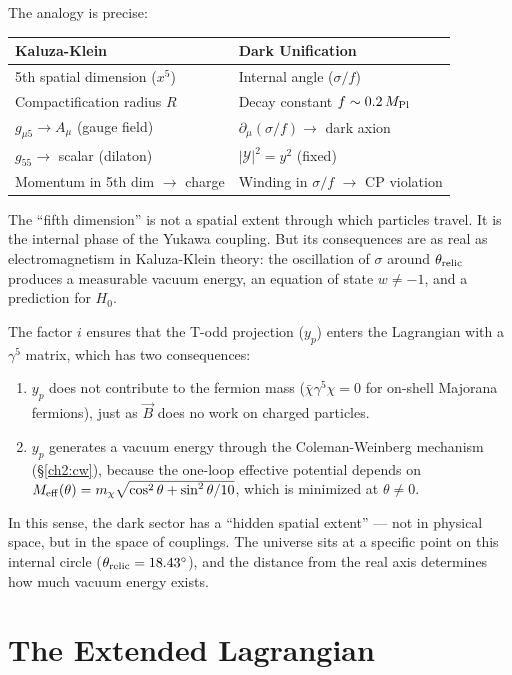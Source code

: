 The analogy is precise:

\begin{table}[h!]
\centering
\begin{tabular}{ll}
\toprule
Kaluza-Klein & Dark Unification \\
\midrule
5th spatial dimension ($x^5$) & Internal angle ($\sigma/f$) \\
Compactification radius $R$ & Decay constant $f \sim 0.2\,M_{\rm Pl}$ \\
$g_{\mu 5} \to A_\mu$ (gauge field) & $\partial_\mu(\sigma/f) \to$ dark axion \\
$g_{55} \to$ scalar (dilaton) & $|\mathcal{Y}|^2 = y^2$ (fixed) \\
Momentum in 5th dim $\to$ charge & Winding in $\sigma/f$ $\to$ CP violation \\
\bottomrule
\end{tabular}
\end{table}

The ``fifth dimension'' is not a spatial extent through which particles travel.
It is the internal phase of the Yukawa coupling. But its consequences are as
real as electromagnetism in Kaluza-Klein theory: the oscillation of $\sigma$
around $\theta_{\rm relic}$ produces a measurable vacuum energy, an equation
of state $w \neq -1$, and a prediction for $H_0$.

The factor $i$ ensures that the T-odd projection ($y_p$) enters the
Lagrangian with a $\gamma^5$ matrix, which has two consequences:
\begin{enumerate}
  \item $y_p$ does not contribute to the fermion mass
        ($\bar{\chi}\gamma^5\chi = 0$ for on-shell Majorana fermions),
        just as $\vec{B}$ does no work on charged particles.
  \item $y_p$ generates a vacuum energy through the Coleman-Weinberg
        mechanism (\S\ref{ch2:cw}), because the one-loop effective potential
        depends on $M_{\rm eff}(\theta) = m_\chi\sqrt{\cos^2\theta + \sin^2\theta/10}$,
        which is minimized at $\theta \neq 0$.
\end{enumerate}

In this sense, the dark sector has a ``hidden spatial extent'' --- not in
physical space, but in the space of couplings. The universe sits at a
specific point on this internal circle ($\theta_{\rm relic} = 18.43^\circ$),
and the distance from the real axis determines how much vacuum energy exists.

\section{The Extended Lagrangian}
\label{ch3:lagrangian}

